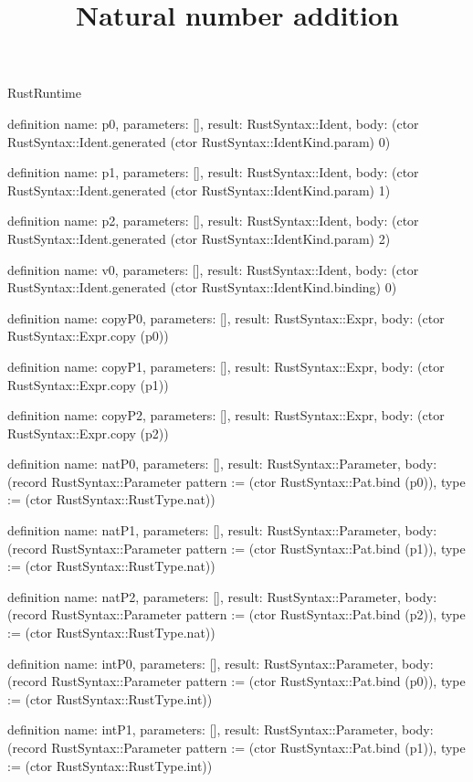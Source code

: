 \begin{lexlean}{RustRuntime}
\title{Natural number addition}
\begin{semanticmodule}
definition{
  name: p0,
  parameters: [],
  result: RustSyntax::Ident,
  body: (ctor RustSyntax::Ident.generated (ctor RustSyntax::IdentKind.param) 0)
}

definition{
  name: p1,
  parameters: [],
  result: RustSyntax::Ident,
  body: (ctor RustSyntax::Ident.generated (ctor RustSyntax::IdentKind.param) 1)
}

definition{
  name: p2,
  parameters: [],
  result: RustSyntax::Ident,
  body: (ctor RustSyntax::Ident.generated (ctor RustSyntax::IdentKind.param) 2)
}

definition{
  name: v0,
  parameters: [],
  result: RustSyntax::Ident,
  body: (ctor RustSyntax::Ident.generated (ctor RustSyntax::IdentKind.binding) 0)
}

definition{
  name: copyP0,
  parameters: [],
  result: RustSyntax::Expr,
  body: (ctor RustSyntax::Expr.copy (p0))
}

definition{
  name: copyP1,
  parameters: [],
  result: RustSyntax::Expr,
  body: (ctor RustSyntax::Expr.copy (p1))
}

definition{
  name: copyP2,
  parameters: [],
  result: RustSyntax::Expr,
  body: (ctor RustSyntax::Expr.copy (p2))
}

definition{
  name: natP0,
  parameters: [],
  result: RustSyntax::Parameter,
  body: (record RustSyntax::Parameter {pattern := (ctor RustSyntax::Pat.bind (p0)), type := (ctor RustSyntax::RustType.nat)})
}

definition{
  name: natP1,
  parameters: [],
  result: RustSyntax::Parameter,
  body: (record RustSyntax::Parameter {pattern := (ctor RustSyntax::Pat.bind (p1)), type := (ctor RustSyntax::RustType.nat)})
}

definition{
  name: natP2,
  parameters: [],
  result: RustSyntax::Parameter,
  body: (record RustSyntax::Parameter {pattern := (ctor RustSyntax::Pat.bind (p2)), type := (ctor RustSyntax::RustType.nat)})
}

definition{
  name: intP0,
  parameters: [],
  result: RustSyntax::Parameter,
  body: (record RustSyntax::Parameter {pattern := (ctor RustSyntax::Pat.bind (p0)), type := (ctor RustSyntax::RustType.int)})
}

definition{
  name: intP1,
  parameters: [],
  result: RustSyntax::Parameter,
  body: (record RustSyntax::Parameter {pattern := (ctor RustSyntax::Pat.bind (p1)), type := (ctor RustSyntax::RustType.int)})
}


\end{semanticmodule}
\end{lexlean}
